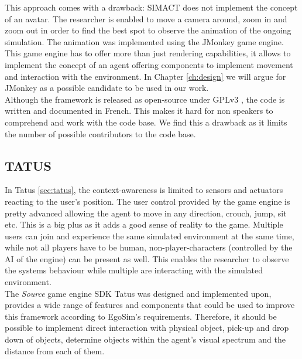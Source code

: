 This approach comes with a drawback: SIMACT does not implement the concept of an avatar. The researcher is enabled to move a camera around, zoom in and zoom out in order to find the best spot to observe the animation of the ongoing simulation. The animation was implemented using the JMonkey game engine. This game engine has to offer more than just rendering capabilities, it allows to implement the concept of an agent offering components to implement movement and interaction with the environment. In Chapter \ref{ch:design} we will argue for JMonkey as a possible candidate to be used in our work.\\

Although the framework is released as open-source \cite{bouchard:simact:Online} under GPLv3 \cite{gpl:v3}, the code is written and documented in French. This makes it hard for non speakers to comprehend and work with the code base. We find this a drawback as it limits the number of possible contributors to the code base.\\

\subsection{TATUS}\label{subsec:discussion_tatus}
In Tatus \ref{sec:tatus}, the context-awareness is limited to sensors and actuators reacting to the user's position. The user control provided by the game engine is pretty advanced allowing the agent to move in any direction, crouch, jump, sit etc. This is a big plus as it adds a good sense of reality to the game. Multiple users can join and experience the same simulated environment at the same time, while not all players have to be human, non-player-characters (controlled by the AI of the engine) can be present as well. This enables the researcher to observe the systems behaviour while multiple are interacting with the simulated environment.\\

The \emph{Source} game engine SDK \cite{valvesrc:online} Tatus was designed and implemented upon, provides a wide range of features and components that could be used to improve this framework according to EgoSim's requirements. Therefore, it should be possible to implement direct interaction with physical object, pick-up and drop down of objects, determine objects within the agent's visual spectrum and the distance from each of them.\\

